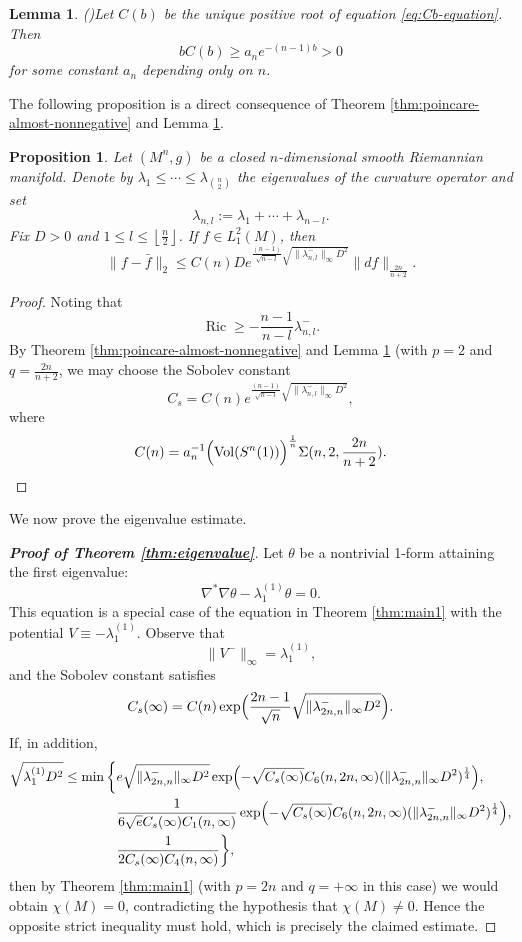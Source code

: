 \documentclass[12pt, twoside]{article}
\newtheorem{lemma}[theorem]{Lemma}
\newtheorem{proposition}[theorem]{Proposition}
\theoremstyle{definition}
\numberwithin{equation}{section}
\def \la {\lambda}
\begin{document}
	\begin{lemma}(\cite[Lemma 2.3]{Huang2025b})\label{lem:Cb-estimate}
		Let \(C(b)\) be the unique positive root of equation \eqref{eq:Cb-equation}. Then
		\[
		b C(b) \ge a_n e^{-(n-1)b} > 0
		\]
		for some constant \(a_n\) depending only on \(n\).
	\end{lemma}
	
	The following proposition is a direct consequence of Theorem \ref{thm:poincare-almost-nonnegative} and Lemma \ref{lem:Cb-estimate}.

	\begin{proposition}\label{P1}
		Let $(M^{n},g)$ be a closed $n$-dimensional smooth Riemannian manifold. Denote by $\lambda_{1}\leq\cdots\leq\lambda_{{n\choose 2}}$ the eigenvalues of the curvature operator and set 
		$$\lambda_{n,l}:=\lambda_{1}+\cdots+\lambda_{n-l}.$$ 
		Fix $D>0$ and $1\leq l\leq\left\lfloor\frac{n}{2}\right\rfloor$. If $f \in L^2_1(M)$, then
		\[
		\|f-\bar{f}\|_{2} \leq C(n) D e^{\frac{(n-1)}{\sqrt{n-l}}\sqrt{\|\la^{-}_{n,l}\|_{\infty} D^{2}}}  \|df\|_{\frac{2n}{n+2}}.
		\]
	\end{proposition}
	\begin{proof}
Noting that
		\[
		\operatorname{Ric}\geq-\frac{n-1}{n-l}\la^{-}_{n,l}.
		\]
By Theorem \ref{thm:poincare-almost-nonnegative} and Lemma \ref{lem:Cb-estimate}  (with \(p=2\) and \(q=\frac{2n}{n+2}\), we may choose the Sobolev constant
		\[
		C_s = C(n) e^{\frac{(n-1)}{\sqrt{n-l}}\sqrt{\|\la^{-}_{n,l}\|_{\infty} D^{2}}},
		\]
		where \[C(n)=a^{-1}_{n}\Bigl(\operatorname{Vol}(S^n(1))\Bigr)^{\frac{1}{n}}\Sigma(n,2,\frac{2n}{n+2}). \]
	\end{proof}
We now prove the eigenvalue estimate.
\begin{proof}[\textbf{Proof of Theorem \ref{thm:eigenvalue}}]
	Let \(\theta\) be a nontrivial 1-form attaining the first eigenvalue:
	\[
	\nabla^*\nabla\theta-\lambda_1^{(1)}\theta =0 .
	\]
	This equation is a special case of the equation in Theorem \ref{thm:main1} with the potential \(V \equiv -\lambda_1^{(1)}\).
	Observe that
	\[
	\|V^{-}\|_{\infty}= \lambda_1^{(1)},
	\]
	and the Sobolev constant satisfies
	\[
	C_s(\infty) = C(n)\exp\Bigl(\frac{2n-1}{\sqrt{n}}
	\sqrt{\|\lambda^{-}_{2n,n}\|_{\infty}D^{2}}\Bigr).
	\]
	If, in addition,
	\begin{align*}
	\sqrt{\lambda_1^{(1)}D^{2}}\leq\min\bigg\{&e\sqrt{\|\la^{-}_{2n,n}\|_{\infty}D^{2}}\exp\Bigl(-\sqrt{C_s(\infty)}C_6(n,2n,\infty)(\|\la^{-}_{2n,n}\|_{\infty}D^{2})^{\frac{1}{4}}\Big),\\
	& \frac{1}{6\sqrt{e}C_s(\infty) C_{1}(n,\infty)}\exp\Bigl(-\sqrt{C_s(\infty)}C_6(n,2n,\infty)(\|\la^{-}_{2n,n}\|_{\infty}D^{2})^{\frac{1}{4}}\Bigr ),\\
	&\frac{1}{2C_s(\infty) C_{4}(n,\infty)}\bigg\},
	\end{align*}
	then by Theorem \ref{thm:main1} (with \(p=2n\) and \(q=+\infty\) in this case) we would obtain \(\chi(M)=0\), contradicting the hypothesis that \(\chi(M)\neq0\).
	Hence the opposite strict inequality must hold, which is precisely the claimed estimate.
\end{proof}
\end{document}

